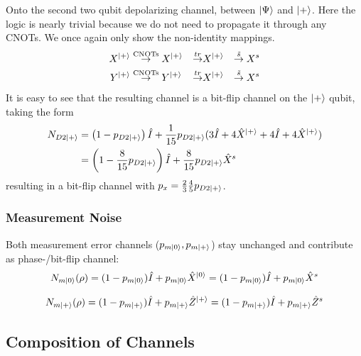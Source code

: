 Onto the second two qubit depolarizing channel, between $\ket{\Psi}$ and $\ket{+}$.
Here the logic is nearly trivial because we do not need to propagate it through any CNOTs.
We once again only show the non-identity mappings.
\begin{align*}
    X^{\ket{+}} 
    &\overset{\text{CNOTs}}{\rightarrow} X^{\ket{+}}  
    &\overset{tr}{\rightarrow} & X^{\ket{+}} 
    &\overset{\tilde{s}}{\rightarrow} X^s  \\
    Y^{\ket{+}} 
    &\overset{\text{CNOTs}}{\rightarrow} Y^{\ket{+}} 
    &\overset{tr}{\rightarrow} & X^{\ket{+}} 
    &\overset{\tilde{s}}{\rightarrow} X^s  \\
\end{align*}
It is easy to see that the resulting channel is a bit-flip channel on the $\ket{+}$ qubit, taking the form
\begin{align*}
    N_{D2\ket{+}} &= \left(1- p_{D2\ket{+}} \right) \hat{I} + \frac{1}{15} p_{D2\ket{+}}(3\hat{I} + 4 \hat{X}^{\ket{+}} + 4\hat{I} + 4 \hat{X}^{\ket{+}}) \\
    &= \left(1- \frac{8}{15} p_{D2\ket{+}} \right) \hat{I} + \frac{8}{15}p_{D2\ket{+}}  \hat{X}^{s}
\end{align*}
resulting in a bit-flip channel with $p_x = \frac{2}{3}\frac{4}{5}p_{D2\ket{+}}$.


\subsubsection{Measurement Noise}
Both measurement error channels ($p_{m\ket{0}},p_{m\ket{+}}$) stay unchanged
and contribute as phase-/bit-flip channel:
\begin{equation*}
    N_{m\ket{0}} (\rho) =(1-p_{m\ket{0}})\hat{I} + p_{m\ket{0}} \hat{X}^{\ket{0}} =  (1-p_{m\ket{0}})\hat{I} + p_{m\ket{0}} \hat{X}^s
\end{equation*}

\begin{equation*}
    N_{m\ket{+}} (\rho) =  (1-p_{m\ket{+}})\hat{I} + p_{m\ket{+}} \hat{Z}^{\ket{+}} = (1-p_{m\ket{+}})\hat{I} + p_{m\ket{+}} \hat{Z}^s
\end{equation*}




\subsection{Composition of Channels}\label{ssec:sem_composition_of_channels}

